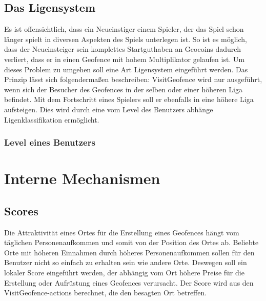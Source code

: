 \documentclass{scrreprt}
\begin{document}
\subsection{Das Ligensystem}
Es ist offensichtlich, dass ein Neueinstiger einem Spieler, der das Spiel schon länger spielt in diversen Aspekten des Spiels unterlegen ist. So ist es möglich, dass der Neueinsteiger sein komplettes Startguthaben an Geocoins dadurch verliert, dass er in einen Geofence mit hohem Multiplikator gelaufen ist. Um dieses Problem zu umgehen soll eine Art Ligensystem eingeführt werden. Das Prinzip lässt sich folgendermaßen beschreiben: VisitGeofence wird nur ausgeführt, wenn sich der Besucher des Geofences in der selben oder einer höheren Liga befindet. Mit dem Fortschritt eines Spielers soll er ebenfalls in eine höhere Liga aufsteigen. Dies wird durch eine vom Level des Benutzers abhänge Ligenklassifikation ermöglicht.
\subsubsection{Level eines Benutzers}

\section{Interne Mechanismen}
\subsection{Scores}
Die Attraktivität eines Ortes für die Erstellung eines Geofences hängt vom täglichen Personenaufkommen und somit von der Position des Ortes ab. Beliebte Orte mit höheren Einnahmen durch höheres Personenaufkommen sollen für den Benutzer nicht so einfach zu erhalten sein wie andere Orte. Deswegen soll ein lokaler Score eingeführt werden, der abhängig vom Ort höhere Preise für die Erstellung oder Aufrüstung eines Geofences verursacht. Der Score wird aus den VisitGeofence-actions berechnet, die den besagten Ort betreffen. 
\end{document}
